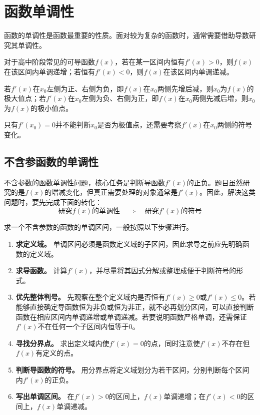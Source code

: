 

\section{函数单调性}
函数的单调性是函数最重要的性质。面对较为复杂的函数时，通常需要借助导数研究其单调性。

对于高中阶段常见的可导函数$f(x)$，若在某一区间内恒有$f'(x)>0$，则$f(x)$在该区间内单调递增；若恒有$f'(x)<0$，则$f(x)$在该区间内单调递减。

若$f'(x)$在$x_0$左侧为正、右侧为负，即$f(x)$在$x_0$两侧先增后减，则$x_0$为$f(x)$的极大值点；若$f'(x)$在$x_0$左侧为负、右侧为正，即$f(x)$在$x_0$两侧先减后增，则$x_0$为$f(x)$的极小值点。

\begin{remark}
只有$f'(x_0)=0$并不能判断$x_0$是否为极值点，还需要考察$f'(x)$在$x_0$两侧的符号变化。
\end{remark}

\subsection{不含参函数的单调性}

不含参数的函数单调性问题，核心任务是判断导函数$f'(x)$的正负。题目虽然研究的是$f(x)$的增减变化，但真正需要处理的对象通常是$f'(x)$。因此，解决这类问题时，要先完成下面的转化：
\[
\boxed{
\text{研究$f(x)$的单调性}
\quad\Longrightarrow\quad
\text{研究$f'(x)$的符号}
}
\]

\medskip
{}

求一个不含参数的函数的单调区间，一般按照以下步骤进行。

\begin{enumerate}
  \item \textbf{求定义域。} 单调区间必须是函数定义域的子区间，因此求导之前应先明确函数的定义域。
  \item \textbf{求导函数。} 计算$f'(x)$，并尽量将其因式分解或整理成便于判断符号的形式。
  \item \textbf{优先整体判号。} 先观察在整个定义域内是否恒有$f'(x)\geqslant0$或$f'(x)\leqslant0$。若能够直接确定导函数恒为非负或恒为非正，就不必再划分区间，可以直接判断函数在相应区间内单调递增或单调递减。若要说明函数严格单调，还需保证$f'(x)$不在任何一个子区间内恒等于$0$。
  \item \textbf{寻找分界点。} 求出定义域内使$f'(x)=0$的点，同时注意使$f'(x)$不存在但$f(x)$有定义的点。
  \item \textbf{判断导函数的符号。} 用分界点将定义域划分为若干区间，分别判断每个区间内$f'(x)$的正负。
  \item \textbf{写出单调区间。} 在$f'(x)>0$的区间上，$f(x)$单调递增；在$f'(x)<0$的区间上，$f(x)$单调递减。
\end{enumerate}

